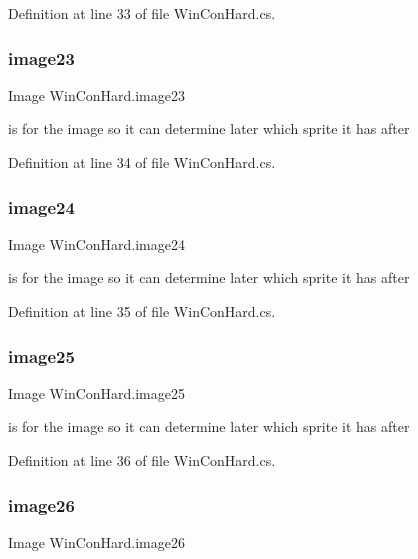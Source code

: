 Definition at line 33 of file Win\+Con\+Hard.\+cs.

\mbox{\label{class_win_con_hard_a143621e60d4e00925c27fadbc0509247}} 
\subsubsection{\texorpdfstring{image23}{image23}}
{\footnotesize\ttfamily Image Win\+Con\+Hard.\+image23}

is for the image so it can determine later which sprite it has after 

Definition at line 34 of file Win\+Con\+Hard.\+cs.

\mbox{\label{class_win_con_hard_a93a8702e4f1a9485c860b0be434658cc}} 
\subsubsection{\texorpdfstring{image24}{image24}}
{\footnotesize\ttfamily Image Win\+Con\+Hard.\+image24}

is for the image so it can determine later which sprite it has after 

Definition at line 35 of file Win\+Con\+Hard.\+cs.

\mbox{\label{class_win_con_hard_adf75be51ec9c0e6298a7fc47521d519f}} 
\subsubsection{\texorpdfstring{image25}{image25}}
{\footnotesize\ttfamily Image Win\+Con\+Hard.\+image25}

is for the image so it can determine later which sprite it has after 

Definition at line 36 of file Win\+Con\+Hard.\+cs.

\mbox{\label{class_win_con_hard_aee2b4445a3f8a60b28c146f40947b24d}} 
\subsubsection{\texorpdfstring{image26}{image26}}
{\footnotesize\ttfamily Image Win\+Con\+Hard.\+image26}

